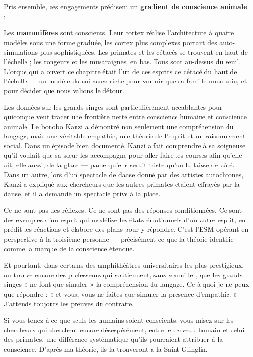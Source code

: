 \documentclass[11pt, twoside, openright]{book}
\begin{document}
Pris ensemble, ces engagements prédisent un \textbf{gradient de conscience animale} :

Les \textbf{mammifères} sont conscients. Leur cortex réalise l'architecture à quatre modèles sous une forme graduée, les cortex plus complexes portant des auto-simulations plus sophistiquées. Les primates et les cétacés se trouvent en haut de l'échelle ; les rongeurs et les musaraignes, en bas. Tous sont au-dessus du seuil. L'orque qui a ouvert ce chapitre était l'un de ces esprits de cétacé du haut de l'échelle --- un modèle du soi assez riche pour vouloir que sa famille nous voie, et pour décider que nous valions le détour.

Les données sur les grands singes sont particulièrement accablantes pour quiconque veut tracer une frontière nette entre conscience humaine et conscience animale. Le bonobo Kanzi a démontré non seulement une compréhension du langage, mais une véritable empathie, une théorie de l'esprit et un raisonnement social. Dans un épisode bien documenté, Kanzi a fait comprendre à sa soigneuse qu'il voulait que sa sœur les accompagne pour aller faire les courses afin qu'elle ait, elle aussi, de la glace --- parce qu'elle serait triste qu'on la laisse de côté. Dans un autre, lors d'un spectacle de danse donné par des artistes autochtones, Kanzi a expliqué aux chercheurs que les autres primates étaient effrayés par la danse, et il a demandé un spectacle privé à la place.

Ce ne sont pas des réflexes. Ce ne sont pas des réponses conditionnées. Ce sont des exemples d'un esprit qui modélise les états émotionnels d'un autre esprit, en prédit les réactions et élabore des plans pour y répondre. C'est l'ESM opérant en perspective à la troisième personne --- précisément ce que la théorie identifie comme la marque de la conscience étendue.

Et pourtant, dans certains des amphithéâtres universitaires les plus prestigieux, on trouve encore des professeurs qui soutiennent, sans sourciller, que les grands singes « ne font que simuler » la compréhension du langage. Ce à quoi je ne peux que répondre : « et vous, vous ne faites que simuler la présence d'empathie. » J'attends toujours les preuves du contraire.

Si vous tenez à ce que seuls les humains soient conscients, vous misez sur les chercheurs qui cherchent encore désespérément, entre le cerveau humain et celui des primates, une différence systématique qu'ils pourraient attribuer à la conscience. D'après ma théorie, ils la trouveront à la Saint-Glinglin.
\end{document}
